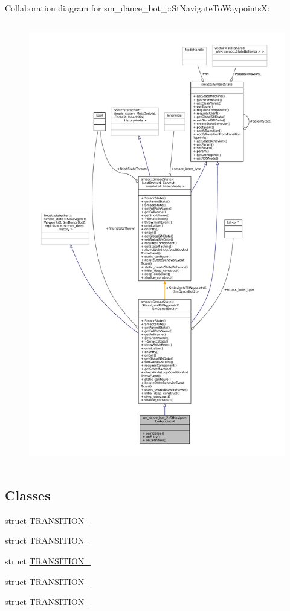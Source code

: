 Collaboration diagram for sm\+\_\+dance\+\_\+bot\+\_\+:\+:St\+Navigate\+To\+WaypointsX\+:
\nopagebreak
\begin{figure}[H]
\begin{center}
\leavevmode
\includegraphics[height=550pt]{structsm__dance__bot__2_1_1StNavigateToWaypointsX__coll__graph}
\end{center}
\end{figure}
\subsection*{Classes}
\begin{DoxyCompactItemize}
\item 
struct \hyperlink{structsm__dance__bot__2_1_1StNavigateToWaypointsX_1_1TRANSITION__1}{T\+R\+A\+N\+S\+I\+T\+I\+O\+N\+\_}
\item 
struct \hyperlink{structsm__dance__bot__2_1_1StNavigateToWaypointsX_1_1TRANSITION__2}{T\+R\+A\+N\+S\+I\+T\+I\+O\+N\+\_}
\item 
struct \hyperlink{structsm__dance__bot__2_1_1StNavigateToWaypointsX_1_1TRANSITION__3}{T\+R\+A\+N\+S\+I\+T\+I\+O\+N\+\_}
\item 
struct \hyperlink{structsm__dance__bot__2_1_1StNavigateToWaypointsX_1_1TRANSITION__4}{T\+R\+A\+N\+S\+I\+T\+I\+O\+N\+\_}
\item 
struct \hyperlink{structsm__dance__bot__2_1_1StNavigateToWaypointsX_1_1TRANSITION__5}{T\+R\+A\+N\+S\+I\+T\+I\+O\+N\+\_}
\end{DoxyCompactItemize}
